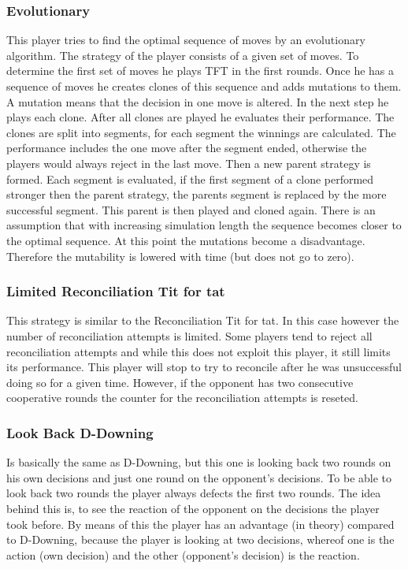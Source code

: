 \documentclass[11pt,twoside]{article}
\begin{document}
\subsubsection{Evolutionary}
This player tries to find the optimal sequence of moves by an evolutionary algorithm. The strategy of the player consists of a given set of moves. To determine the first set of moves he plays TFT in the first rounds.
Once he has a sequence of moves he creates clones of this sequence and adds mutations to them. A mutation means that the decision in one move is altered.
In the next step he plays each clone. After all clones are played he evaluates their performance.
The clones are split into segments, for each segment the winnings are calculated. The performance includes the one move after the segment ended, otherwise the players would always reject in the last move.
Then a new parent strategy is formed. Each segment is evaluated, if the first segment of a clone performed stronger then the parent strategy, the parents segment is replaced by the more successful segment.
This parent is then played and cloned again.
There is an assumption that with increasing simulation length the sequence becomes closer to the optimal sequence. At this point the mutations become a disadvantage. Therefore the mutability is lowered with time (but does not go to zero).

\subsubsection{Limited Reconciliation Tit for tat}
This strategy is similar to the Reconciliation Tit for tat. In this case however the number of reconciliation attempts is limited. Some players tend to reject all reconciliation attempts and while this does not exploit this player, it still limits its performance. This player will stop to try to reconcile after he was unsuccessful doing so for a given time. However, if the opponent has two consecutive cooperative rounds the counter for the reconciliation attempts is reseted. 

\subsubsection{Look Back D-Downing}

Is basically the same as D-Downing, but this one is looking back two rounds on his own decisions and just one round on the opponent's decisions. To be able to look back two rounds the player always defects the first two rounds. The idea behind this is, to see the reaction of the opponent on the decisions the player took before. By means of this the player has an advantage (in theory) compared to D-Downing, because the player is looking at two decisions, whereof one is the action (own decision) and the other (opponent's decision) is the reaction.   
\end{document}

